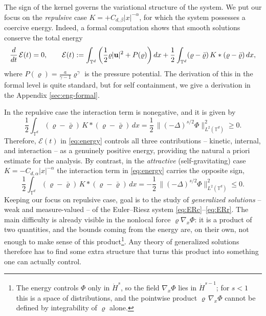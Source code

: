 \documentclass[12pt,a4paper,twoside]{article}
\newcommand{\vr}{\varrho}
\newcommand{\vu}{\vc{u}}
\newcommand{\vc}[1]{{\bf #1}}
\newcommand{\Grad}{\nabla}
\numberwithin{equation}{section}%
\begin{document}
	\medskip
	The sign of the kernel governs the variational structure of the system. We put our focus on the \emph{repulsive} case $K = +C_{d,\beta}|x|^{-\alpha}$, for which the system possesses a coercive energy. Indeed, a formal computation shows that smooth solutions conserve the total energy
	\begin{equation}\label{eq:energy}
		\frac{d}{dt}\, \mathcal{E}(t) = 0, \qquad
		\mathcal{E}(t) := \int_{\mathbb{T}^d} \left( \frac{1}{2}\vr|\vu|^2 + P(\vr) \right) dx
		+ \frac{1}{2}\int_{\mathbb{T}^d} (\vr-\bar\vr)\, K\ast(\vr-\bar\vr)\,dx,
	\end{equation}
	where $P(\vr) = \tfrac{a}{\gamma-1}\vr^\gamma$ is the pressure potential. The derivation of this in the formal level is quite standard, but for self containment, we give a derivation in the Appendix \ref{sec:eng-formal}. \par
	 In the repulsive case the interaction term is nonegative, and it is given by
	\begin{equation*}%
		\frac{1}{2}\int_{\mathbb{T}^d} (\vr-\bar\vr)\, K\ast(\vr-\bar\vr)\,dx
		= \frac{1}{2}\, \big\| (-\Delta)^{s/2}\Phi \big\|_{L^2(\mathbb{T}^d)}^2 \ge 0.
	\end{equation*}
	Therefore, $\mathcal{E}(t)$ in \eqref{eq:energy} controls all three contributions -- kinetic, internal, and interaction -- as a genuinely positive energy, providing the natural a priori estimate for the analysis.
	\medskip
	By contrast, in the \emph{attractive} (self-gravitating) case $K = -C_{d,\alpha}|x|^{-\alpha}$ the interaction term in \eqref{eq:energy} carries the opposite sign,
	\begin{equation*}
		\frac{1}{2}\int_{\mathbb{T}^d} (\vr-\bar\vr)\, K\ast(\vr-\bar\vr)\,dx
		= -\frac{1}{2}\, \big\| (-\Delta)^{s/2}\Phi \big\|_{L^2(\mathbb{T}^d)}^2 \le 0.
	\end{equation*}
	Keeping our focus on repulsive case, goal is to the study of \emph{generalized solutions} -- weak and measure-valued -- of the Euler--Riesz system \eqref{eq:ERc}--\eqref{eq:ERr}. The main difficulty is already visible in the nonlocal force $\vr\Grad_x\Phi$: it is a product of
	two quantities, and the bounds coming from the energy are, on their own, not enough to make sense
	of this product\footnote{The energy controls $\Phi$ only in $\dot H^{s}$, so the field
		$\Grad_x\Phi$ lies in $\dot H^{s-1}$; for $s<1$ this is a space of distributions, and the pointwise
		product $\vr\,\Grad_x\Phi$ cannot be defined by integrability of $\vr$ alone.}. Any theory of
	generalized solutions therefore has to find some extra structure that turns this product into
	something one can actually control.
	\medskip
	
\end{document}
